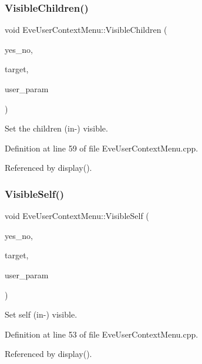 \subsubsection{\texorpdfstring{Visible\+Children()}{VisibleChildren()}}
{\footnotesize\ttfamily void Eve\+User\+Context\+Menu\+::\+Visible\+Children (\begin{DoxyParamCaption}\item[{bool}]{yes\+\_\+no,  }\item[{\hyperlink{class_t_object}{T\+Object} $\ast$}]{target,  }\item[{void $\ast$}]{user\+\_\+param }\end{DoxyParamCaption})}



Set the children (in-\/) visible. 



Definition at line 59 of file Eve\+User\+Context\+Menu.\+cpp.



Referenced by display().

\hypertarget{class_d_d4hep_1_1_eve_user_context_menu_a2c1bc8b4c3aa1fbedb1eed0c26b2fe65}{}\label{class_d_d4hep_1_1_eve_user_context_menu_a2c1bc8b4c3aa1fbedb1eed0c26b2fe65} 
\subsubsection{\texorpdfstring{Visible\+Self()}{VisibleSelf()}}
{\footnotesize\ttfamily void Eve\+User\+Context\+Menu\+::\+Visible\+Self (\begin{DoxyParamCaption}\item[{bool}]{yes\+\_\+no,  }\item[{\hyperlink{class_t_object}{T\+Object} $\ast$}]{target,  }\item[{void $\ast$}]{user\+\_\+param }\end{DoxyParamCaption})}



Set self (in-\/) visible. 



Definition at line 53 of file Eve\+User\+Context\+Menu.\+cpp.



Referenced by display().



